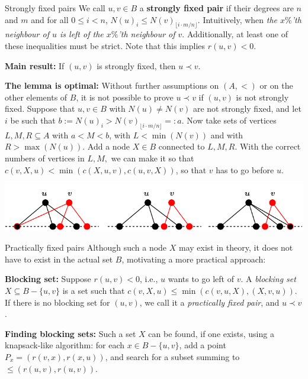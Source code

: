 \documentclass[final]{beamer}
\newlength{\colwidth}
\theoremstyle{remark}
\renewcommand{\b}{\prec}
\begin{document}
\begin{frame}[t]
\begin{columns}[t]
\begin{column}{\colwidth}
      \begin{block}{Strongly fixed pairs}
        We call $u, v \in B$ a \textbf{strongly fixed pair} if their degrees are $n$
        and $m$ and for all $0 \leq i < n$, $N(u)_i \leq N(v)_{\lfloor i\cdot m/n
          \rfloor}$.
        Intuitively, when \emph{the $x\%$'th neighbour of $u$ is left of the $x\%$'th
        neighbour of $v$}. Additionally, at least one of these inequalities must be strict.
        Note that this implies $r(u, v) < 0$.

        \textbf{Main result:}
        If $(u, v)$ is strongly fixed, then $u \b v$.

        \textbf{The lemma is optimal:}
        Without further assumptions on $(A, <)$ or on the other elements of $B$, it is not
          possible to prove $u \b v$ if $(u, v)$ is not strongly fixed.
        Suppose that $u, v \in B$ with $N(u) \neq N(v)$ are not strongly fixed, and let $i$ be
        such that $b:=N(u)_i > N(v)_{\lfloor i\cdot m/n\rfloor}=:a$. Now take sets of vertices $L, M,
          R \subseteq A$ with $a < M < b$, with $L < \min(N(v))$ and with $R > \max(N(u))$.
          Add a node $X \in B$ connected to $L, M, R$. With the correct numbers of vertices in
          $L, M, $ we can make it so that $c(v, X, u) < \min(c(X, u, v), c(u, v, X))$, so that
        $v$ has to go before $u$.

        \centering
        \includegraphics[scale=1.5]{fig/strongly-fixed.pdf}

      \end{block}

      \begin{block}{Practically fixed pairs}
        Although such a node $X$ may exist in theory, it does
        not have to exist in the actual set $B$, motivating a more practical approach:

        \textbf{Blocking set:}
        Suppose $r(u,v)< 0$, i.e., $u$ wants to go left of $v$.
        A \emph{blocking set} $X\subseteq B-\{u,v\}$ is a set such that $c(v,X,u) \leq \min(c(v, u,
        X), (X, v, u))$.  If there is no blocking set for $(u, v)$, we call it a
        \emph{practically fixed pair}, and $u\b v$.
      \end{block}

      \textbf{Finding blocking sets:}
      Such a set $X$ can be found, if one exists, using a knapsack-like algorithm: for
      each $x\in B-\{u,v\}$, add a point $P_x = (r(v, x), r(x, u))$, and search for a subset summing
      to ${\leq{}(r(u, v), r(u, v))}$.


\end{column}
\end{columns}
\end{frame}
\end{document}
